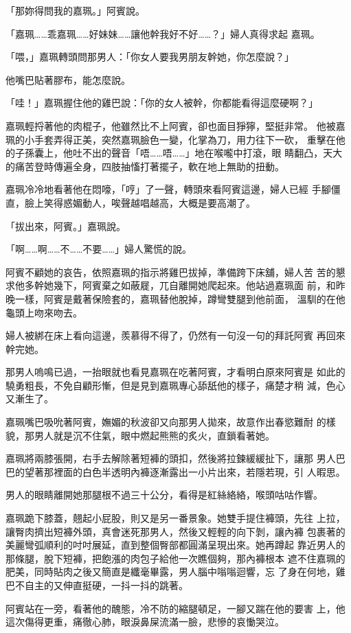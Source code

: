 「那妳得問我的嘉珮。」阿賓說。

「嘉珮……乖嘉珮……好妹妹……讓他幹我好不好……？」婦人真得求起
嘉珮。

「喂，」嘉珮轉頭問那男人：「你女人要我男朋友幹她，你怎麼說？」

他嘴巴貼著膠布，能怎麼說。

「哇！」嘉珮握住他的雞巴說：「你的女人被幹，你都能看得這麼硬啊？」

嘉珮輕捋著他的肉棍子，他雖然比不上阿賓，卻也面目猙獰，堅挺非常。
他被嘉珮的小手套弄得正美，突然嘉珮臉色一變，化掌為刀，用力往下一砍，
重擊在他的子孫囊上，他吐不出的聲音「唔……唔……」地在喉嚨中打滾，眼
睛翻凸，天大的痛苦登時傳遍全身，四肢抽慉打著擺子，軟在地上無助的扭動。

嘉珮冷冷地看著他在悶嚎，「哼」了一聲，轉頭來看阿賓這邊，婦人已經
手腳僵直，臉上笑得惑媚動人，唉聲越唱越高，大概是要高潮了。

「拔出來，阿賓。」嘉珮說。

「啊……啊……不……不要……」婦人驚慌的說。

阿賓不顧她的哀告，依照嘉珮的指示將雞巴拔掉，準備跨下床舖，婦人苦
苦的懇求他多幹她幾下，阿賓棄之如蔽屣，兀自離開她爬起來。他站過嘉珮面
前，和昨晚一樣，阿賓是戴著保險套的，嘉珮替他脫掉，蹲彎雙腿到他前面，
溫馴的在他龜頭上吻來吻去。

婦人被綁在床上看向這邊，羨慕得不得了，仍然有一句沒一句的拜託阿賓
再回來幹完她。

那男人嗚鳴已過，一抬眼就也看見嘉珮在吃著阿賓，才看明白原來阿賓是
如此的驍勇粗長，不免自顧形慚，但是見到嘉珮專心舔舐他的樣子，痛楚才稍
減，色心又漸生了。

嘉珮嘴巴吸吮著阿賓，嫵媚的秋波卻又向那男人拋來，故意作出春慾難耐
的樣貌，那男人就是沉不住氣，眼中燃起熊熊的炙火，直鎖看著她。

嘉珮將兩膝張開，右手去解除著短褲的頭扣，然後將拉鍊緩緩扯下，讓那
男人巴巴的望著那裡面的白色半透明內褲逐漸露出一小片出來，若隱若現，引
人暇思。

男人的眼睛離開她那腿根不過三十公分，看得是紅絲絡絡，喉頭咕咕作響。

嘉珮跪下膝蓋，翹起小屁股，則又是另一番景象。她雙手提住褲頭，先往
上拉，讓臀肉擠出短褲外頭，真會迷死那男人，然後又輕輕的向下剝，讓內褲
包裹著的美麗彎弧順利的吋吋展延，直到整個臀部都圓滿呈現出來。她再蹲起
靠近男人的那條腿，脫下短褲，把飽漲的肉包子給他一次瞧個夠，那內褲根本
遮不住嘉珮的肥美，同時貼肉之後又簡直是纖毫畢露，男人腦中嗡嗡迴響，忘
了身在何地，雞巴不自主的又伸直挺硬，一抖一抖的跳著。

阿賓站在一旁，看著他的醜態，冷不防的縮腿頓足，一腳又踹在他的要害
上，他這次傷得更重，痛徹心肺，眼淚鼻屎流滿一臉，悲慘的哀慟哭泣。

